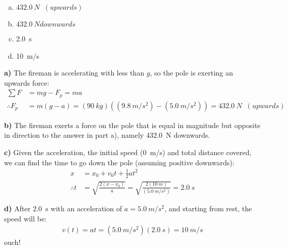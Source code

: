 \begin{finalanswer}
\begin{enumerate}[(a)]
\item $\SI{432.0}{N}\;\;(upwards)$
\item $\SI{432.0}{N} downwards$
\item \SI{2.0}{s}
\item \SI{10}{m/s}
\end{enumerate}
\end{finalanswer}
\begin{solution}
\textbf{a)} The fireman is accelerating with less than $g$, so the pole is exerting an upwards force:
\begin{align*}
\sum F &= mg-F_p=ma\\
\therefore F_p &= m(g-a)=(\SI{90}{kg})( (\SI{9.8}{m/s^2}) - (\SI{5.0}{m/s^2}) )=\SI{432.0}{N}\;\;(upwards)
\end{align*}

\textbf{b)} The fireman exerts a force on the pole that is equal in magnitude but opposite in direction to the answer in part a), namely \SI{432.0}{N} downwards.

\textbf{c)} Given the acceleration, the initial speed (\SI{0}{m/s}) and total distance covered, we can find the time to go down the pole (assuming positive downwards):
\begin{align*}
x&=x_0+v_0t+\frac{1}{2}at^2\\
\therefore t&=\sqrt{\frac{2(x-x_0)}{a}}=\sqrt{\frac{2(\SI{10}{m})}{(\SI{5.0}{m/s^2})}}=\SI{2.0}{s}
\end{align*}

\textbf{d)} After \SI{2.0}{s} with an acceleration of $a=\SI{5.0}{m/s^2}$, and starting from rest, the speed will be:
\begin{align*}
v(t)=at=(\SI{5.0}{m/s^2})(\SI{2.0}{s})=\SI{10}{m/s}
\end{align*}
ouch!

\end{solution}

